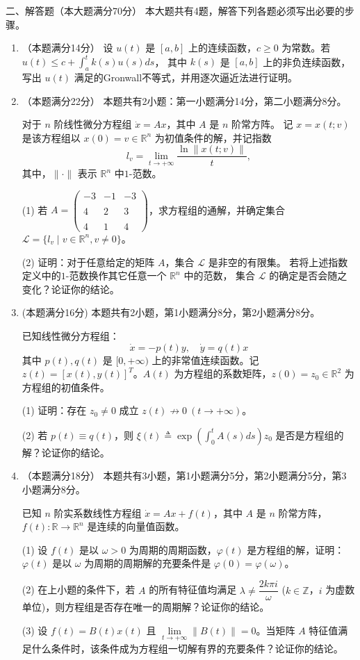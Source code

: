 二、解答题（本大题满分70分）
本大题共有4题，解答下列各题必须写出必要的步骤。
\begin{enumerate}
\item[5.] （本题满分14分）
设 $u(t)$ 是 $[a,b]$ 上的连续函数，$c \geq 0$ 为常数。若 $u(t) \leq c + \int_a^t k(s) u(s) ds$，
其中 $k(s)$ 是 $[a,b]$ 上的非负连续函数，写出 $u(t)$ 满足的Gronwall不等式，并用逐次逼近法进行证明。

\item[6.] （本题满分22分）
本题共有2小题：第一小题满分14分，第二小题满分8分。

对于 $n$ 阶线性微分方程组 $\dot{x} = Ax$，其中 $A$ 是 $n$ 阶常方阵。
记 $x = x(t; v)$ 是该方程组以 $x(0) = v \in \mathbb{R}^n$ 为初值条件的解，并记指数
\[
l_v = \lim_{t \to +\infty} \frac{\ln\|x(t; v)\|}{t},
\]
其中，$\|\cdot\|$ 表示 $\mathbb{R}^n$ 中$1$-范数。

(1) 若 $A = \begin{pmatrix}
-3 & -1 & -3 \\ \\
4 & 2 & 3 \\ \\
4 & 1 & 4
\end{pmatrix}$，求方程组的通解，并确定集合 $\mathcal{L} = \{ l_v \mid v \in \mathbb{R}^n, v \neq 0 \}$。

(2) 证明：对于任意给定的矩阵 $A$，集合 $\mathcal{L}$ 是非空的有限集。
若将上述指数定义中的$1$-范数换作其它任意一个 $\mathbb{R}^n$ 中的范数，
集合 $\mathcal{L}$ 的确定是否会随之变化？论证你的结论。

\item[7.] (本题满分16分)
本题共有2小题，第1小题满分8分，第2小题满分8分。

已知线性微分方程组：
\[
\dot{x} = -p(t)y, \quad \dot{y} = q(t)x
\]
其中 $p(t), q(t)$ 是 $[0, +\infty)$ 上的非常值连续函数。记 $z(t) = [x(t), y(t)]^T$。$A(t)$ 为方程组的系数矩阵，$z(0) = z_0 \in \mathbb{R}^2$ 为方程组的初值条件。

(1) 证明：存在 $z_0 \neq 0$ 成立 $z(t) \not\to 0 \ (t \to +\infty)$。

(2) 若 $p(t) \equiv q(t)$，则 $\xi(t) \triangleq \exp\left(\int_0^t A(s)ds\right)z_0$ 是否是方程组的解？论证你的结论。

\item[8.] （本题满分18分）
本题共有3小题，第1小题满分5分，第2小题满分5分，第3小题满分8分。

已知 $n$ 阶实系数线性方程组 $\dot{x} = Ax + f(t)$，其中 $A$ 是 $n$ 阶常方阵，$f(t): \mathbb{R} \to \mathbb{R}^n$ 是连续的向量值函数。

(1) 设 $f(t)$ 是以 $\omega > 0$ 为周期的周期函数，$\varphi(t)$ 是方程组的解，证明：$\varphi(t)$ 是以 $\omega$ 为周期的周期解的充要条件是 $\varphi(0) = \varphi(\omega)$。

(2) 在上小题的条件下，若 $A$ 的所有特征值均满足 $\lambda \neq \dfrac{2k\pi i}{\omega}$ ($k \in \mathbb{Z}$，$i$ 为虚数单位)，则方程组是否存在唯一的周期解？论证你的结论。

(3) 设 $f(t) = B(t)x(t)$ 且 $\lim\limits_{t \to +\infty} \|B(t)\| = 0$。当矩阵 $A$ 特征值满足什么条件时，该条件成为方程组一切解有界的充要条件？论证你的结论。
\end{enumerate}


